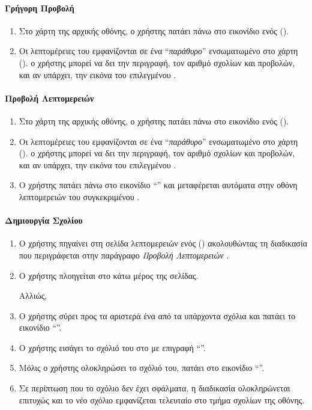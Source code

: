 \paragraph{Γρήγορη Προβολή }
\begin{enumerate}
    \item Στο χάρτη της αρχικής οθόνης, ο χρήστης πατάει πάνω στο εικονίδιο ενός  (\textit{}).
    \item Οι λεπτομέρειες του  εμφανίζονται σε ένα ``\textit{παράθυρο}'' ενσωματωμένο στο χάρτη (\textit{}). ο χρήστης μπορεί να δει την περιγραφή, τον αριθμό σχολίων και προβολών, και αν υπάρχει, την εικόνα του επιλεγμένου .
\end{enumerate}

\paragraph{Προβολή Λεπτομερειών }
\begin{enumerate}
    \item Στο χάρτη της αρχικής οθόνης, ο χρήστης πατάει πάνω στο εικονίδιο ενός  (\textit{}).
    \item Οι λεπτομέρειες του  εμφανίζονται σε ένα ``\textit{παράθυρο}'' ενσωματωμένο στο χάρτη (\textit{}). ο χρήστης μπορεί να δει την περιγραφή, τον αριθμό σχολίων και προβολών, και αν υπάρχει, την εικόνα του επιλεγμένου .
    \item Ο χρήστης πατάει πάνω στο εικονίδιο ``\textit{}'' και μεταφέρεται αυτόματα στην οθόνη λεπτομερειών του συγκεκριμένου .
\end{enumerate}

\paragraph{Δημιουργία Σχολίου}
\begin{enumerate}
    \item Ο χρήστης πηγαίνει στη σελίδα λεπτομερειών ενός  (\textit{}) ακολουθώντας τη διαδικασία που περιγράφεται στην παράγραφο \textit{Προβολή Λεπτομερειών }.
    \item Ο χρήστης πλοηγείται στο κάτω μέρος της σελίδας.
    
    Αλλιώς,
    \item Ο χρήστης σύρει προς τα αριστερά ένα από τα υπάρχοντα σχόλια και πατάει το εικονίδιο ``\textit{}''.
    \item Ο χρήστης εισάγει το σχόλιό του στο \textit{} με επιγραφή ``\textit{}''.
    \item Μόλις ο χρήστης ολοκληρώσει το σχόλιό του, πατάει στο εικονίδιο ``\textit{}''.
    \item Σε περίπτωση που το σχόλιο δεν έχει σφάλματα, η διαδικασία ολοκληρώνεται επιτυχώς και το νέο σχόλιο εμφανίζεται τελευταίο στο τμήμα σχολίων της οθόνης.
\end{enumerate}

